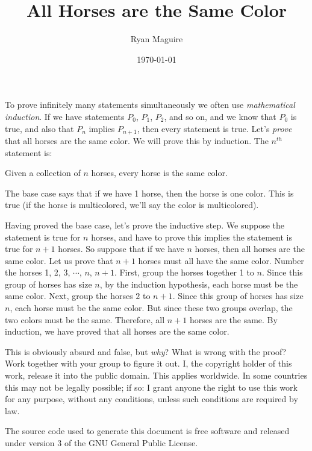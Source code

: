 \documentclass{article}
\title{All Horses are the Same Color}
\author{Ryan Maguire}
\date{\today}
\begin{document}
    \maketitle
    To prove infinitely many statements simultaneously we often use
    \textit{mathematical induction}. If we have statements
    $P_{0}$, $P_{1}$, $P_{2}$, and so on, and we know that $P_{0}$ is true,
    and also that $P_{n}$ implies $P_{n+1}$, then every statement is true.
    Let's \textit{prove} that all horses are the same color.
    We will prove this by induction. The $n^{th}$ statement is:
    \begin{center}
        Given a collection of $n$ horses, every horse is the same color.
    \end{center}
    \par\hfill\par
    The base case says that if we have 1 horse, then the horse is one color.
    This is true (if the horse is multicolored, we'll say the color is
    multicolored).
    \par\hfill\par
    Having proved the base case, let's prove the inductive step. We suppose
    the statement is true for $n$ horses, and have to prove this implies the
    statement is true for $n+1$ horses. So suppose that if we have $n$ horses,
    then all horses are the same color. Let us prove that $n+1$ horses must
    all have the same color. Number the horses 1, 2, 3, $\cdots$, $n$, $n+1$.
    First, group the horses together 1 to $n$. Since this group of horses has
    size $n$, by the induction hypothesis, each horse must be the same color.
    Next, group the horses $2$ to $n+1$. Since this group of horses has size
    $n$, each horse must be the same color. But since these two groups overlap,
    the two colors must be the same. Therefore, all $n+1$ horses are the same.
    By induction, we have proved that all horses are the same color.
    \par\hfill\par
    This is obviously absurd and false, but \textit{why}? What is wrong with
    the proof? Work together with your group to figure it out.
    \newpage
    I, the copyright holder of this work, release it into the public domain.
    This applies worldwide. In some countries this may not be legally possible;
    if so: I grant anyone the right to use this work for any purpose, without
    any conditions, unless such conditions are required by law.
    \par\hfill\par
    The source code used to generate this document is free software and released
    under version 3 of the GNU General Public License.
\end{document}
